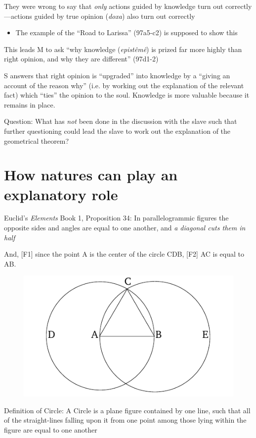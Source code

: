 \documentclass[10 pt]{article}
\begin{document}
\noindent They were wrong to say that \emph{only} actions guided by knowledge turn out correctly---actions guided by true opinion (\emph{doxa}) also turn out correctly

\begin{itemize}\item{The example of the ``Road to Larissa'' (97a5-c2) is supposed to show this}\end{itemize}

\noindent This leads M to ask ``why knowledge (\emph{epist\^{e}m\^{e}}) is prized far more highly than right opinion, and why they are different'' (97d1-2)
\vspace*{2mm}

\noindent S answers that right opinion is ``upgraded'' into knowledge by a ``giving an account of the reason why'' (i.e. by working out the explanation of the relevant fact) which ``ties'' the opinion to the soul. Knowledge is more valuable because it remains in place.
\vspace*{2mm}

\noindent Question: What has \emph{not} been done in the discussion with the slave such that further questioning could lead the slave to work out the explanation of the geometrical theorem?
\vspace*{2mm}

\section*{How natures can play an explanatory role}

\noindent Euclid's \emph{Elements} Book 1, Proposition 34: In parallelogrammic figures the opposite sides and angles are equal to one another, and \emph{a diagonal cuts them in half}
\vspace*{2mm}

\noindent And, [F1] since the point A is the center of the circle CDB, [F2] AC is equal to AB.

\begin{figure}[h!]
\centering
\includegraphics[scale=0.7]{circle}
\end{figure}

\noindent Definition of Circle: A Circle is a plane figure contained by one line, such that all of the straight-lines falling upon it from one point among those lying within the figure are equal to one another
\end{document}
